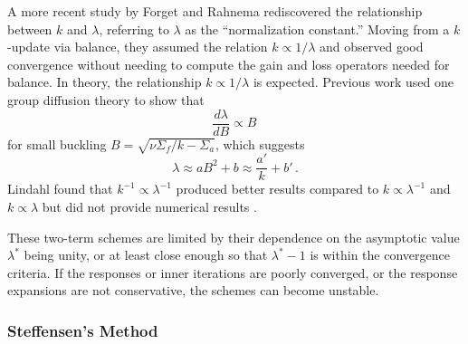 A more recent study by Forget and Rahnema \cite{forget2005nee} 
rediscovered the relationship
between $k$ and $\lambda$, referring to $\lambda$ as
the ``normalization constant.''
Moving from a $k$-update via balance, they assumed the relation 
$k \propto 1/\lambda$ and observed good convergence without 
needing to compute the gain and loss operators needed for balance.  
In theory, the relationship $k \propto 1/\lambda$ is expected.  
Previous work \cite{roberts2014cer} used one group diffusion 
theory to show that 
\begin{equation}
 \frac{d \lambda}{d B} \propto  B \, 
\end{equation}
for small
buckling $B = \sqrt{\nu \Sigma_f/k - \Sigma_a}$, which
suggests
\begin{equation}
 \lambda \approx  a B^2 + b \approx \frac{a'}{k} + b' \, .
\end{equation}
Lindahl found that $k^{-1} \propto \lambda^{-1}$ produced better results
compared to  $k \propto \lambda^{-1}$ and $k \propto \lambda$ but
did not provide numerical results \cite{lindahl1976mdr}.

These two-term schemes are limited by their
dependence on the asymptotic value $\lambda^*$ being unity, or at least 
close enough so that $\lambda^*-1$ is within the convergence 
criteria.  If the responses or inner iterations are poorly converged, or
the response expansions are not conservative, the 
schemes can become unstable.

\subsubsection{Steffensen's Method}
\label{sec:steffensensmethod}

